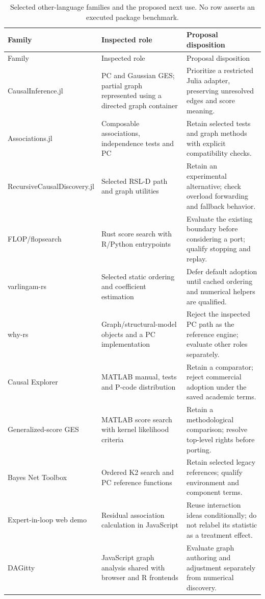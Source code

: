 \begingroup\small
\begin{longtable}{@{}p{.22\linewidth}p{.35\linewidth}p{.35\linewidth}@{}}
\caption{Selected other-language families and the proposed next use. No row
asserts an executed package benchmark.}\label{tab:exec13-other-roles}\\
\toprule Family & Inspected role & Proposal disposition\\
\midrule\endfirsthead
\toprule Family & Inspected role & Proposal disposition\\
\midrule\endhead
CausalInference.jl & PC and Gaussian GES; partial graph represented using a
directed graph container & Prioritize a restricted Julia adapter, preserving
unresolved edges and score meaning.\\
Associations.jl & Composable associations, independence tests and PC & Retain
selected tests and graph methods with explicit compatibility checks.\\
RecursiveCausalDiscovery.jl & Selected RSL-D path and graph utilities & Retain
an experimental alternative; check overload forwarding and fallback behavior.\\
FLOP/flopsearch & Rust score search with R/Python entrypoints & Evaluate the
existing boundary before considering a port; qualify stopping and replay.\\
varlingam-rs & Selected static ordering and coefficient estimation & Defer
default adoption until cached ordering and numerical helpers are qualified.\\
why-rs & Graph/structural-model objects and a PC implementation & Reject the
inspected PC path as the reference engine; evaluate other roles separately.\\
Causal Explorer & MATLAB manual, tests and P-code distribution & Retain a
comparator; reject commercial adoption under the saved academic terms.\\
Generalized-score GES & MATLAB score search with kernel likelihood criteria &
Retain a methodological comparison; resolve top-level rights before porting.\\
Bayes Net Toolbox & Ordered K2 search and PC reference functions & Retain
selected legacy references; qualify environment and component terms.\\
Expert-in-loop web demo & Residual association calculation in JavaScript &
Reuse interaction ideas conditionally; do not relabel its statistic as a
treatment effect.\\
DAGitty & JavaScript graph analysis shared with browser and R frontends &
Evaluate graph authoring and adjustment separately from numerical discovery.\\
\bottomrule
\end{longtable}
\endgroup


